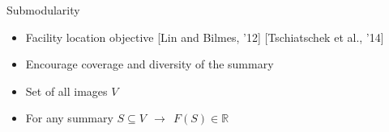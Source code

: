 \documentclass[mathserif]{beamer}
\newcommand{\qcite}[1]{{\scriptsize\color{col2}[#1]}}
\begin{document}
\begin{frame}{Submodularity}
\vspace{0.5em}
\begin{itemize}
\item<1-> Facility location objective \qcite{Lin and Bilmes, '12} \qcite{Tschiatschek et al., '14}
\vspace{0.5em}
\item<2-> Encourage coverage and diversity of the summary
\vspace{0.5em}
\item<3-> Set of all images $V$
\vspace{0.5em}
\item<4-> For any summary $S \subseteq V\ \ \longrightarrow\ \ F(S) \in \mathbb{R}$
\end{itemize}

\vspace{0.5em}
\centering
{}%
%
\end{frame}
\end{document}

